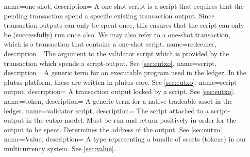 {
  name=one-shot,
  description={
    A one-shot script is a script that requires that the pending transaction spend a specific existing transaction output.
    Since transaction outputs can only be spent once, this ensures that the script can only be (successfully) run once also.
    We may also refer to a one-shot transaction, which is a transaction that contains a one-shot script.
  }
}
{
  name=redeemer,
  description={
    The argument to the validator \gls{script} which is provided by the transaction which spends a \gls{script-output}.
    See \cref{sec:eutxo}.
  }
}
{
  name=script,
  description={
    A generic term for an executable program used in the ledger.
    In the \gls{plutus-platform}, these are written in \gls{plutus-core}.
    See \cref{sec:eutxo}.
  }
}
{
  name=script output,
  description={
    A transaction output locked by a \gls{script}.
    See \cref{sec:eutxo}.
  }
}
{
  name=token,
  description={
    A generic term for a native tradeable asset in the ledger.
  }
}
{
  name=validator script,
  description={
    The \gls{script} attached to a \gls{script-output} in the \gls{eutxo-model}.
    Must be run and return positively in order for the output to be spent.
    Determines the \gls{address} of the output.
    See \cref{sec:eutxo}.
  }
}
{
  name=\textsf{Value},
  description={
    A type representing a bundle of assets (\glspl{token}) in our \gls{multicurrency} system.
    See \cref{sec:value}.
  }
}

